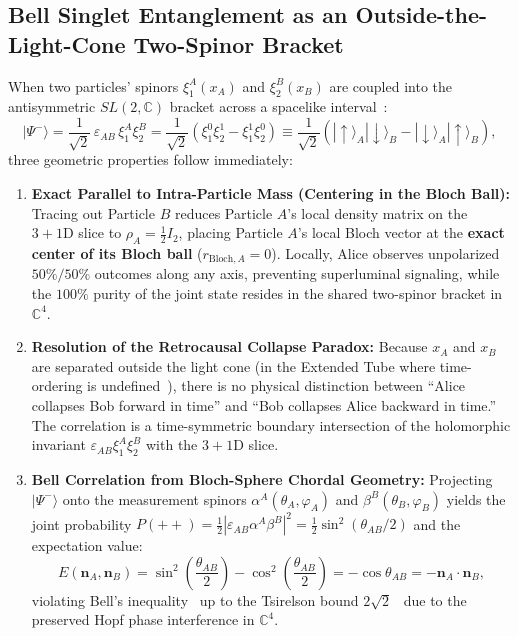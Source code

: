 \documentclass[11pt,a4paper]{article}
\begin{document}
\subsection{Bell Singlet Entanglement as an Outside-the-Light-Cone Two-Spinor Bracket}
When two particles' spinors $\xi_1^A(x_A)$ and $\xi_2^B(x_B)$ are coupled into the antisymmetric $SL(2,\mathbb{C})$ bracket across a spacelike interval~\cite{PenroseRindler1984,Bell1964}:
\begin{equation}
|\Psi^-\rangle = \frac{1}{\sqrt{2}}\, \varepsilon_{AB}\, \xi_1^A \xi_2^B = \frac{1}{\sqrt{2}} \left( \xi_1^0 \xi_2^1 - \xi_1^1 \xi_2^0 \right) \equiv \frac{1}{\sqrt{2}} \left( |\!\uparrow\rangle_A |\!\downarrow\rangle_B - |\!\downarrow\rangle_A |\!\uparrow\rangle_B \right),
\end{equation}
three geometric properties follow immediately:
\begin{enumerate}
    \item \textbf{Exact Parallel to Intra-Particle Mass (Centering in the Bloch Ball):}
    Tracing out Particle $B$ reduces Particle $A$'s local density matrix on the $3+1\text{D}$ slice to $\rho_A = \frac{1}{2} I_2$, placing Particle $A$'s local Bloch vector at the \textbf{exact center of its Bloch ball} ($r_{\text{Bloch}, A} = 0$). Locally, Alice observes unpolarized $50\%/50\%$ outcomes along any axis, preventing superluminal signaling, while the $100\%$ purity of the joint state resides in the shared two-spinor bracket in $\mathbb{C}^4$.
    \item \textbf{Resolution of the Retrocausal Collapse Paradox:}
    Because $x_A$ and $x_B$ are separated outside the light cone (in the Extended Tube where time-ordering is undefined~\cite{StreaterWightman1964}), there is no physical distinction between ``Alice collapses Bob forward in time'' and ``Bob collapses Alice backward in time.'' The correlation is a time-symmetric boundary intersection of the holomorphic invariant $\varepsilon_{AB}\xi_1^A\xi_2^B$ with the $3+1\text{D}$ slice.
    \item \textbf{Bell Correlation from Bloch-Sphere Chordal Geometry:}
    Projecting $|\Psi^-\rangle$ onto the measurement spinors $\alpha^A(\theta_A, \varphi_A)$ and $\beta^B(\theta_B, \varphi_B)$ yields the joint probability $P(++) = \frac{1}{2}|\varepsilon_{AB}\alpha^A\beta^B|^2 = \frac{1}{2}\sin^2(\theta_{AB}/2)$ and the expectation value:
    \begin{equation}
    E(\mathbf{n}_A, \mathbf{n}_B) = \sin^2\left(\frac{\theta_{AB}}{2}\right) - \cos^2\left(\frac{\theta_{AB}}{2}\right) = -\cos\theta_{AB} = -\mathbf{n}_A \cdot \mathbf{n}_B,
    \end{equation}
    violating Bell's inequality~\cite{Bell1964} up to the Tsirelson bound $2\sqrt{2}$~\cite{Tsirelson1980} due to the preserved Hopf phase interference in $\mathbb{C}^4$.
\end{enumerate}
\end{document}
